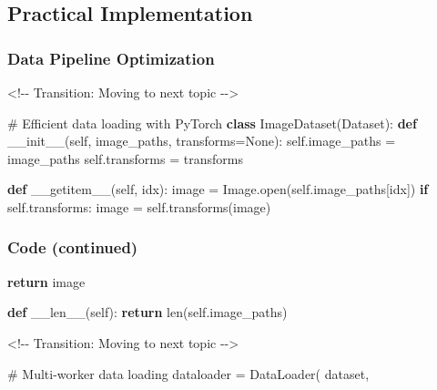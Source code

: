 \documentclass[
]{article}
\newenvironment{Shaded}{\begin{snugshade}}{\end{snugshade}}
\newcommand{\BuiltInTok}[1]{\textcolor[rgb]{0.00,0.23,0.31}{#1}}
\newcommand{\CommentTok}[1]{\textcolor[rgb]{0.37,0.37,0.37}{#1}}
\newcommand{\ControlFlowTok}[1]{\textcolor[rgb]{0.00,0.23,0.31}{\textbf{#1}}}
\newcommand{\FunctionTok}[1]{\textcolor[rgb]{0.28,0.35,0.67}{#1}}
\newcommand{\KeywordTok}[1]{\textcolor[rgb]{0.00,0.23,0.31}{\textbf{#1}}}
\newcommand{\NormalTok}[1]{\textcolor[rgb]{0.00,0.23,0.31}{#1}}
\newcommand{\OperatorTok}[1]{\textcolor[rgb]{0.37,0.37,0.37}{#1}}
\newcommand{\VariableTok}[1]{\textcolor[rgb]{0.07,0.07,0.07}{#1}}
\begin{document}
\subsection{Practical Implementation}\label{practical-implementation}

\subsubsection{Data Pipeline
Optimization}\label{data-pipeline-optimization}

\begin{Shaded}
\begin{Highlighting}[]


\OperatorTok{\textless{}!{-}{-}}\NormalTok{ Transition: Moving to }\BuiltInTok{next}\NormalTok{ topic }\OperatorTok{{-}{-}\textgreater{}}



\CommentTok{\# Efficient data loading with PyTorch}
\KeywordTok{class}\NormalTok{ ImageDataset(Dataset):}
    \KeywordTok{def} \FunctionTok{\_\_init\_\_}\NormalTok{(}\VariableTok{self}\NormalTok{, image\_paths, transforms}\OperatorTok{=}\VariableTok{None}\NormalTok{):}
        \VariableTok{self}\NormalTok{.image\_paths }\OperatorTok{=}\NormalTok{ image\_paths}
        \VariableTok{self}\NormalTok{.transforms }\OperatorTok{=}\NormalTok{ transforms}
        
    \KeywordTok{def} \FunctionTok{\_\_getitem\_\_}\NormalTok{(}\VariableTok{self}\NormalTok{, idx):}
\NormalTok{        image }\OperatorTok{=}\NormalTok{ Image.}\BuiltInTok{open}\NormalTok{(}\VariableTok{self}\NormalTok{.image\_paths[idx])}
        \ControlFlowTok{if} \VariableTok{self}\NormalTok{.transforms:}
\NormalTok{            image }\OperatorTok{=} \VariableTok{self}\NormalTok{.transforms(image)}
\end{Highlighting}
\end{Shaded}

\subsubsection{Code (continued)}\label{code-continued-1}

\begin{Shaded}
\begin{Highlighting}[]
        \ControlFlowTok{return}\NormalTok{ image}
        
    \KeywordTok{def} \FunctionTok{\_\_len\_\_}\NormalTok{(}\VariableTok{self}\NormalTok{):}
        \ControlFlowTok{return} \BuiltInTok{len}\NormalTok{(}\VariableTok{self}\NormalTok{.image\_paths)}





\OperatorTok{\textless{}!{-}{-}}\NormalTok{ Transition: Moving to }\BuiltInTok{next}\NormalTok{ topic }\OperatorTok{{-}{-}\textgreater{}}



\CommentTok{\# Multi{-}worker data loading}
\NormalTok{dataloader }\OperatorTok{=}\NormalTok{ DataLoader(}
\NormalTok{    dataset, }
\end{Highlighting}
\end{Shaded}
\end{document}
